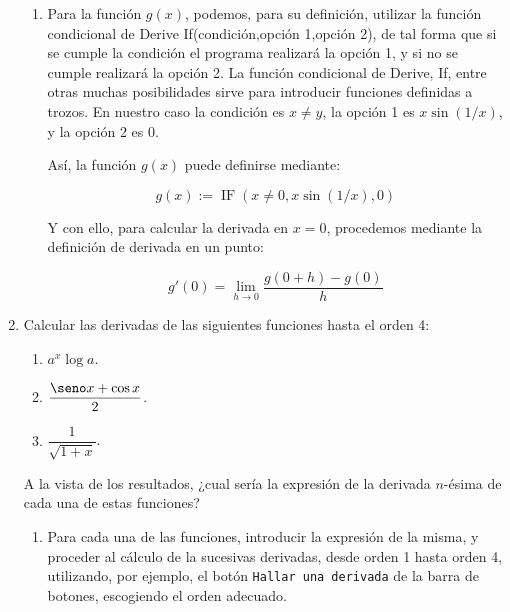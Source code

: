 \begin{enumerate}[leftmargin=*]
\begin{indication}
{\begin{enumerate}
\[
f'(1) = \mathop {\lim }\limits_{h \to 0} \frac{{f(1 + h) - f(1)}}
{h}
\]

\item Para la función $g(x)$, podemos, para su definición,
utilizar la función condicional de Derive
\textsf{If(condición,opción 1,opción 2)}, de tal forma que si se
cumple la \textsf{condición} el programa realizará la
\textsf{opción 1}, y si no se cumple realizará la \textsf{opción
2}. La función condicional de Derive, \textsf{If}, entre otras
muchas posibilidades sirve para introducir funciones definidas a
trozos. En nuestro caso la \textsf{condición} es $x\neq y$, la
\textsf{opción 1} es $x\sin(1/x)$, y la \textsf{opción 2} es $0$.

Así, la función $g(x)$ puede definirse mediante:

\[
g(x):=\operatorname{IF}(x\neq0,x\sin(1/x),0)
\]


Y con ello, para calcular la derivada en $x=0$, procedemos
mediante la definición de derivada en un punto:


\[
g'(0) = \mathop {\lim }\limits_{h \to 0} \frac{{g(0 + h) - g(0)}}
{h} 
\]



\end{enumerate}
}
\end{indication}


\item  Calcular las derivadas de las siguientes funciones hasta el
orden 4:

\begin{enumerate}
\item  $a^x\log a$.

\item  $\dfrac{\seno x +\cos x}{2}$.

\item  $\dfrac{1}{\sqrt{1+x}}$.
\end{enumerate}

A la vista de los resultados, ¿cual sería la expresión de la
derivada $n$-ésima de cada una de estas funciones?

\begin{indication}
{
\begin{enumerate}
\item Para cada una de las funciones, introducir la expresión de
la misma, y proceder al cálculo de la sucesivas derivadas, desde
orden 1 hasta orden 4, utilizando, por ejemplo, el botón
\texttt{Hallar una derivada} de la barra de botones, escogiendo el
orden adecuado.


\end{enumerate}}
\end{indication}
\end{enumerate}
